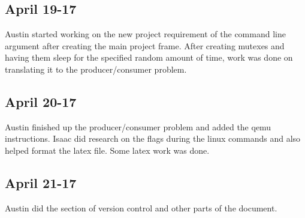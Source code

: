 \documentclass[letterpaper,10pt,titlepage]{article}
\begin{document}
\subsection{April 19-17}
Austin started working on the new project requirement of the command line argument after creating the main project frame.  After creating mutexes and having them sleep for the specified random amount of time, work was done on translating it to the producer/consumer problem.
\subsection{April 20-17}
Austin finished up the producer/consumer problem and added the qemu instructions. Isaac did research on the flags during the linux commands and also helped format the latex file.  Some latex work was done.
\subsection{April 21-17}
Austin did the section of version control and other parts of the document.

%
%
\end{document}
